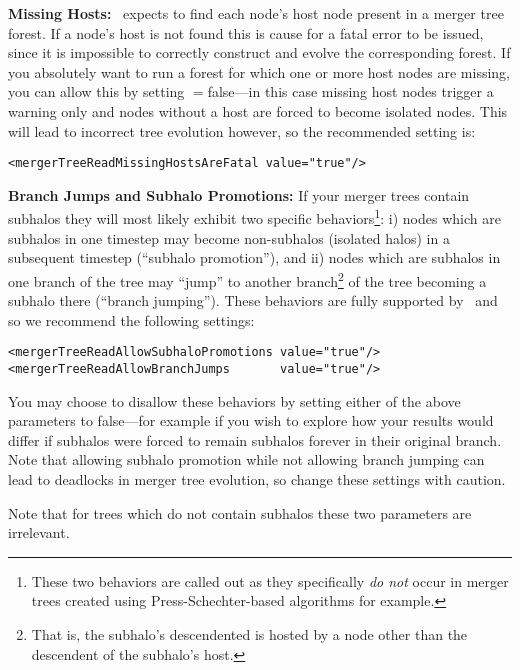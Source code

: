 {\bf Missing Hosts:} \glc\ expects to find each \gls{node}'s host \gls{node} present in a merger tree \gls{forest}. If a \gls{node}'s host is not found this is cause for a fatal error to be issued, since it is impossible to correctly construct and evolve the corresponding \gls{forest}. If you absolutely want to run a \gls{forest} for which one or more host \glspl{node} are missing, you can allow this by setting {\normalfont \ttfamily [mergerTreeReadMissingHostsAreFatal]}$=${\normalfont \ttfamily false}---in this case missing host \glspl{node} trigger a warning only and \glspl{node} without a host are forced to become isolated \glspl{node}. This will lead to incorrect tree evolution however, so the recommended setting is:
\begin{verbatim}
<mergerTreeReadMissingHostsAreFatal value="true"/>
\end{verbatim}

{\bf Branch Jumps and Subhalo Promotions:} If your merger trees contain subhalos they will most likely exhibit two specific behaviors\footnote{These two behaviors are called out as they specifically \emph{do not} occur in merger trees created using Press-Schechter-based algorithms for example.}: i) \glspl{node} which are subhalos in one timestep may become non-subhalos (isolated halos) in a subsequent timestep (``subhalo promotion''), and ii) \glspl{node} which are subhalos in one branch of the tree may ``jump'' to another branch\footnote{That is, the subhalo's descendented is hosted by a \gls{node} other than the descendent of the subhalo's host.} of the tree becoming a subhalo there (``branch jumping''). These behaviors are fully supported by \glc\ and so we recommend the following settings:
\begin{verbatim}
<mergerTreeReadAllowSubhaloPromotions value="true"/>
<mergerTreeReadAllowBranchJumps       value="true"/>
\end{verbatim}
You may choose to disallow these behaviors by setting either of the above parameters to {\normalfont \ttfamily false}---for example if you wish to explore how your results would differ if subhalos were forced to remain subhalos forever in their original branch. Note that allowing subhalo promotion while not allowing branch jumping can lead to \glspl{deadlock} in merger tree evolution, so change these settings with caution.

Note that for trees which do not contain subhalos these two parameters are irrelevant.

